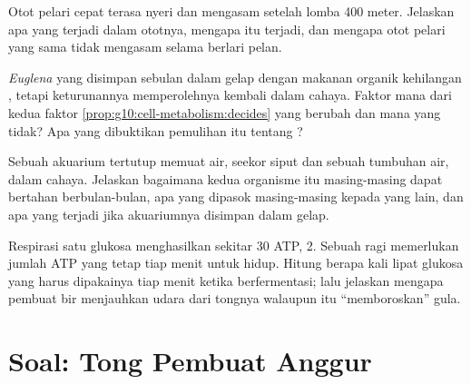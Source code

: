 \begin{exercise}[$\star\star\star$]\label{exo:g10:cell-metabolism:12}
Otot pelari cepat terasa nyeri dan mengasam setelah lomba 400 meter.
Jelaskan apa yang terjadi dalam  ototnya, mengapa itu terjadi, dan
mengapa otot pelari yang sama tidak mengasam selama berlari pelan.
\end{exercise}

\begin{exercise}[$\star\star\star$]\label{exo:g10:cell-metabolism:13}
\emph{Euglena} yang disimpan sebulan dalam gelap dengan makanan organik
kehilangan , tetapi keturunannya memperolehnya kembali
dalam cahaya. Faktor mana dari kedua faktor
\cref{prop:g10:cell-metabolism:decides} yang berubah dan mana yang
tidak? Apa yang dibuktikan pemulihan itu tentang  ?
\end{exercise}

\begin{exercise}[$\star\star\star$]\label{exo:g10:cell-metabolism:14}
Sebuah akuarium tertutup memuat air, seekor siput dan sebuah tumbuhan
air, dalam cahaya. Jelaskan bagaimana kedua organisme itu masing-masing
dapat bertahan berbulan-bulan, apa yang dipasok masing-masing kepada
yang lain, dan apa yang terjadi jika akuariumnya disimpan dalam gelap.
\end{exercise}

\begin{exercise}[$\star\star\star$]\label{exo:g10:cell-metabolism:15}
Respirasi satu glukosa menghasilkan sekitar 30 ATP,  2.
Sebuah  ragi memerlukan jumlah ATP yang tetap tiap menit untuk
hidup. Hitung berapa kali lipat glukosa yang harus dipakainya tiap
menit ketika berfermentasi; lalu jelaskan mengapa pembuat bir menjauhkan
udara dari tongnya walaupun itu ``memboroskan'' gula.
\end{exercise}

\section{Soal: Tong Pembuat Anggur}

